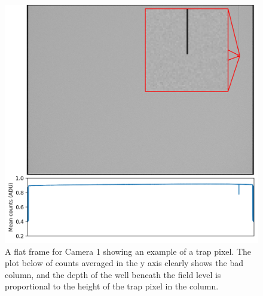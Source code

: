 \begin{colsection}
\begin{colsection}
\begin{figure}[p]
    \begin{center}
        \includegraphics[width=\textwidth]{images/detectors/defect_plot.pdf}
    \end{center}
    \caption[An example of a trap pixel]{
        A flat frame for Camera 1 showing an example of a trap pixel. The plot below of counts averaged in the y axis clearly shows the bad column, and the depth of the well beneath the field level is proportional to the height of the trap pixel in the column.
        }\label{fig:itsatrap}
\end{figure}

\clearpage

\end{colsection}


\end{colsection}


\newpage
